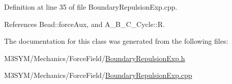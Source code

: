 Definition at line 35 of file Boundary\+Repulsion\+Exp.\+cpp.



References Bead\+::force\+Aux, and A\+\_\+\+B\+\_\+\+C\+\_\+\+Cycle\+::\+R.



The documentation for this class was generated from the following files\+:\begin{DoxyCompactItemize}
\item 
M3\+S\+Y\+M/\+Mechanics/\+Force\+Field/\hyperlink{BoundaryRepulsionExp_8h}{Boundary\+Repulsion\+Exp.\+h}\item 
M3\+S\+Y\+M/\+Mechanics/\+Force\+Field/\hyperlink{BoundaryRepulsionExp_8cpp}{Boundary\+Repulsion\+Exp.\+cpp}\end{DoxyCompactItemize}
